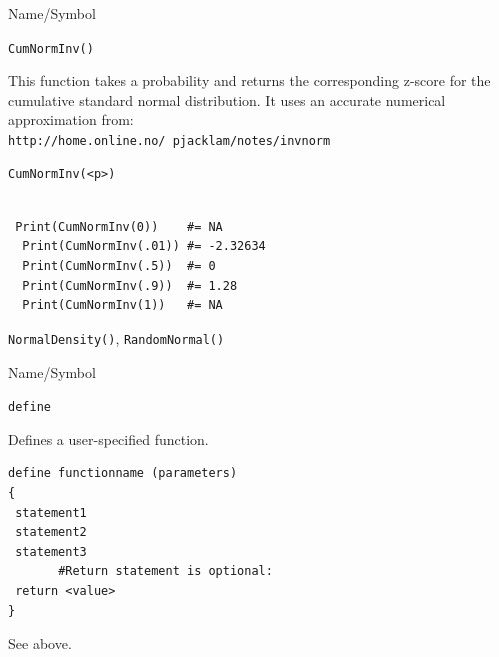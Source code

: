 \begin{desc}{Name/Symbol}
\item[Name/Symbol]  	\verb+CumNormInv()+

\item[Description] 	This function takes a probability and returns the 
  corresponding z-score for the cumulative standard normal distribution.
  It uses an accurate numerical approximation from:\\
  \texttt{http://home.online.no/~pjacklam/notes/invnorm}
\item[Usage]
\begin{verbatim}
CumNormInv(<p>)
\end{verbatim}

\item[Example]
\begin{verbatim}

 Print(CumNormInv(0))    #= NA
  Print(CumNormInv(.01)) #= -2.32634
  Print(CumNormInv(.5))  #= 0
  Print(CumNormInv(.9))  #= 1.28
  Print(CumNormInv(1))   #= NA
\end{verbatim}

\item[See Also] \verb+NormalDensity()+, \verb+RandomNormal()+
\end{desc}


\vfill
\newpage
{}
\vfill

\begin{desc}{Name/Symbol}
\item[Name/Symbol]  	\verb+define+

\item[Description]  	Defines a user-specified function.

\item[Usage]
\begin{verbatim}
define functionname (parameters)
{
 statement1
 statement2
 statement3
       #Return statement is optional:
 return <value>
}
\end{verbatim}

\item[Example]    	See above.

\item[See Also]
\end{desc}   	



